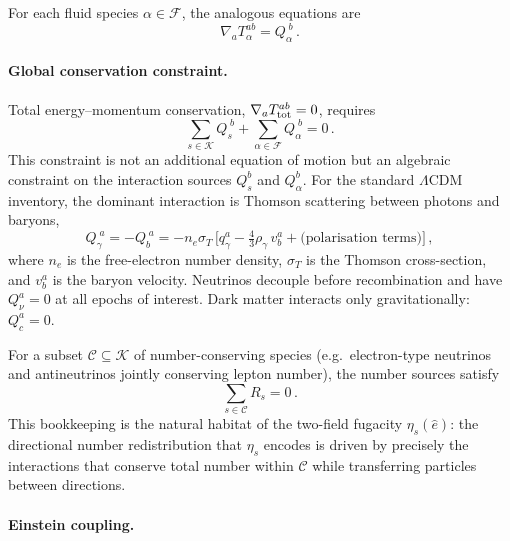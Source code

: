 For each fluid species $\alpha \in \mathcal{F}$, the
analogous equations are
\begin{equation}\label{eq:fluid-conservation}
\nabla_a T_\alpha^{ab} = Q_\alpha^{\;b}\,.
\end{equation}


\paragraph{Global conservation constraint.}

Total energy--momentum conservation,
$\nabla_a T^{ab}_{\rm tot} = 0$, requires
\begin{equation}\label{eq:total-conservation}
\sum_{s \in \mathcal{K}} Q_s^{\;b}
+ \sum_{\alpha \in \mathcal{F}} Q_\alpha^{\;b}
= 0\,.
\end{equation}
This constraint is not an additional equation of motion but an
algebraic constraint on the interaction sources $Q_s^b$
and $Q_\alpha^b$.  For the standard $\Lambda$CDM
inventory, the dominant interaction is Thomson scattering
between photons and baryons,
\begin{equation}\label{eq:Thomson-Q}
Q_\gamma^{\;a} = -Q_b^{\;a}
= -n_e \sigma_T\, \big[
  q_\gamma^a - \tfrac{4}{3}\rho_\gamma\, v_b^a
  + \text{(polarisation terms)}
\big]\,,
\end{equation}
where $n_e$ is the free-electron number density,
$\sigma_T$ is the Thomson cross-section, and $v_b^a$ is
the baryon velocity.  Neutrinos decouple before
recombination and have $Q_\nu^a = 0$ at all epochs of
interest.  Dark matter interacts only gravitationally:
$Q_c^a = 0$.

For a subset $\mathcal{C} \subseteq \mathcal{K}$ of
number-conserving species (e.g.\ electron-type neutrinos
and antineutrinos jointly conserving lepton number), the
number sources satisfy
\begin{equation}\label{eq:number-constraint}
\sum_{s \in \mathcal{C}} R_s = 0\,.
\end{equation}
This bookkeeping is the natural habitat of the two-field
fugacity $\eta_s(\hat{e})$: the directional number
redistribution that $\eta_s$ encodes is driven by
precisely the interactions that conserve total number
within $\mathcal{C}$ while transferring particles between
directions.


\paragraph{Einstein coupling.}

